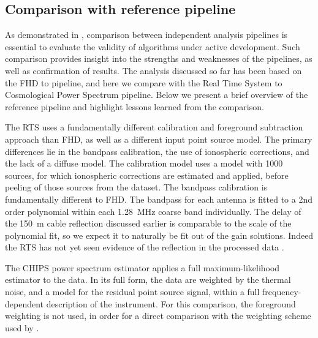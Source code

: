 \documentclass[iop]{emulateapj}
\begin{document}
\subsection{Comparison with reference pipeline}\label{subsec:ref_pipe}

As demonstrated in \citealt{Jacobs:2016}, comparison between independent 
analysis pipelines is essential to evaluate the validity of algorithms under active development. 
Such comparison provides insight into the strengths and weaknesses of the pipelines, as well 
as confirmation of results. The analysis discussed so far has been based on the FHD to 
\eppsilon pipeline, and here we compare with the Real Time System \citep[RTS,][]
{Mitchell:2008,Ord:2010} to Cosmological  Power Spectrum \citep[CHIPS,][]
{Trott:2016} pipeline. Below we present a brief overview of the reference pipeline and 
highlight lessons learned from the comparison.

The RTS uses a fundamentally different calibration and foreground subtraction approach than 
FHD, as well as a different input point source model. 
The primary differences lie in the 
bandpass calibration, the use of ionospheric corrections, and the lack of a diffuse model. The 
calibration model uses a model with 1000 sources, for which ionospheric corrections are 
estimated and applied, before peeling of those sources from the dataset. The bandpass 
calibration is fundamentally different to FHD.
The bandpass for each antenna is fitted to a 2nd order polynomial within each 1.28~MHz coarse 
band individually. The delay of the 150~m cable reflection discussed earlier is comparable
to the scale of the polynomial fit, so we expect it to naturally be fit out of the gain
solutions. Indeed the RTS has not yet seen evidence of the reflection in the processed
data \citep{Jacobs:2016}.

The CHIPS power 
spectrum estimator applies a full maximum-likelihood estimator to the data. In its full form, the 
data are weighted by the thermal noise, and a model for the residual point source signal, 
within a full frequency-dependent description of the instrument. For this comparison, the 
foreground weighting is not used, in order for a direct comparison with the weighting scheme 
used by \eppsilon.
\end{document}
